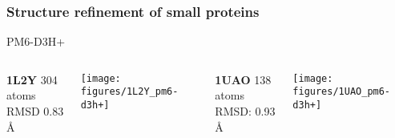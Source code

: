 \documentclass[12pt]{beamer}
\begin{document}
\begin{frame}
    \frametitle{Structure refinement of small proteins}
    
    \begin{center}
    PM6-D3H+
    \end{center}

    \begin{columns}[t]

            {\bf 1L2Y } 304 atoms\\
            RMSD 0.83 \AA

            \bigskip

            \texttt{[image: figures/1L2Y\_pm6-d3h+]}



            {\bf 1UAO } 138 atoms\\
            RMSD: 0.93 \AA

            \bigskip

            \texttt{[image: figures/1UAO\_pm6-d3h+]}



    \end{columns}

\end{frame}
\end{document}
